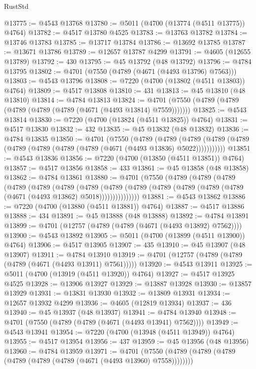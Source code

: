 \begin{lexlean}{RustStd}
\begin{coremodule}
@13775 := @4543 @13768
@13780 := @5011 (@4700 (@13774 (@4511 @13775)) @4764)
@13782 := @4517 @13780 @4525
@13783 := @13763 @13782
@13784 := @13746 @13783
@13785 := @13717 @13784
@13786 := @13692 @13785
@13787 := @13671 @13786
@13789 := @12657 @13787 @4299
@13791 := @4605 (@12655 @13789)
@13792 := 430
@13795 := @45 @13792 (@48 @13792)
@13796 := @4784 @13795
@13802 := @4701 (@7550 (@4789 (@4671 (@4493 @13796) @7563)))
@13803 := @4543 @13796
@13808 := @7220 (@4700 (@13802 (@4511 @13803)) @4764)
@13809 := @4517 @13808
@13810 := 431
@13813 := @45 @13810 (@48 @13810)
@13814 := @4784 @13813
@13824 := @4701 (@7550 (@4789 (@4789 (@4789 (@4789 (@4789 (@4671 (@4493 @13814) @7559)))))))
@13825 := @4543 @13814
@13830 := @7220 (@4700 (@13824 (@4511 @13825)) @4764)
@13831 := @4517 @13830
@13832 := 432
@13835 := @45 @13832 (@48 @13832)
@13836 := @4784 @13835
@13850 := @4701
    (@7550
      (@4789
        (@4789
          (@4789 (@4789 (@4789 (@4789 (@4789 (@4789 (@4789 (@4671 (@4493 @13836) @5022)))))))))))
@13851 := @4543 @13836
@13856 := @7220 (@4700 (@13850 (@4511 @13851)) @4764)
@13857 := @4517 @13856
@13858 := 433
@13861 := @45 @13858 (@48 @13858)
@13862 := @4784 @13861
@13880 := @4701
    (@7550
      (@4789
        (@4789
          (@4789
            (@4789
              (@4789
                (@4789
                  (@4789
                    (@4789
                      (@4789 (@4789 (@4789 (@4789 (@4789 (@4671 (@4493 @13862) @5018)))))))))))))))
@13881 := @4543 @13862
@13886 := @7220 (@4700 (@13880 (@4511 @13881)) @4764)
@13887 := @4517 @13886
@13888 := 434
@13891 := @45 @13888 (@48 @13888)
@13892 := @4784 @13891
@13899 := @4701 (@12757 (@4789 (@4789 (@4671 (@4493 @13892) @7562))))
@13900 := @4543 @13892
@13905 := @5011 (@4700 (@13899 (@4511 @13900)) @4764)
@13906 := @4517 @13905
@13907 := 435
@13910 := @45 @13907 (@48 @13907)
@13911 := @4784 @13910
@13919 := @4701 (@12757 (@4789 (@4789 (@4789 (@4671 (@4493 @13911) @7561)))))
@13920 := @4543 @13911
@13925 := @5011 (@4700 (@13919 (@4511 @13920)) @4764)
@13927 := @4517 @13925 @4525
@13928 := @13906 @13927
@13929 := @13887 @13928
@13930 := @13857 @13929
@13931 := @13831 @13930
@13932 := @13809 @13931
@13934 := @12657 @13932 @4299
@13936 := @4605 (@12819 @13934)
@13937 := 436
@13940 := @45 @13937 (@48 @13937)
@13941 := @4784 @13940
@13948 := @4701 (@7550 (@4789 (@4789 (@4671 (@4493 @13941) @7562))))
@13949 := @4543 @13941
@13954 := @7220 (@4700 (@13948 (@4511 @13949)) @4764)
@13955 := @4517 @13954
@13956 := 437
@13959 := @45 @13956 (@48 @13956)
@13960 := @4784 @13959
@13971 := @4701 (@7550 (@4789 (@4789 (@4789 (@4789 (@4789 (@4789 (@4671 (@4493 @13960) @7558))))))))

\end{coremodule}
\end{lexlean}

